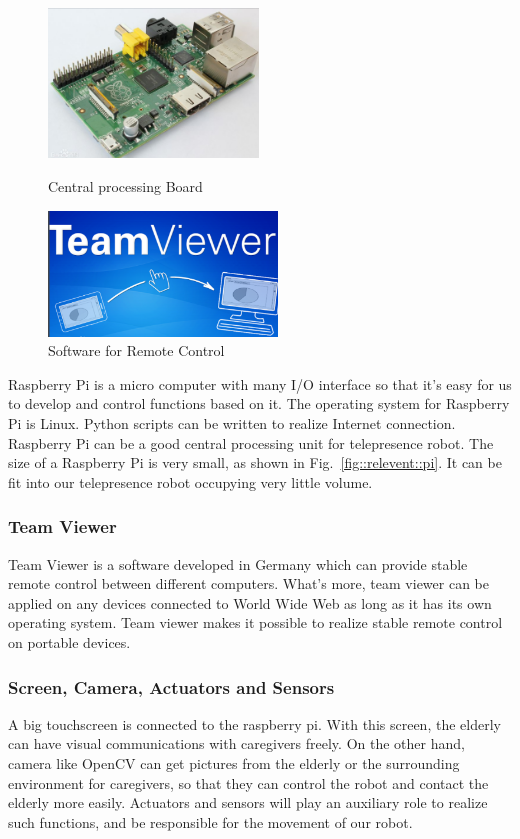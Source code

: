 \documentclass[12pt]{article}
\begin{document}
\begin{figure}[H]
	\begin{minipage}[t]{0.5\linewidth}
		\centering
		\includegraphics[width=2.2in]{P3}
		\caption{Central processing Board\cite{8}}
		\label{fig::relevent::pi}
	\end{minipage}%
	\begin{minipage}[t]{0.5\linewidth}
		\centering
		\includegraphics[width=2.4in]{P4}
		\caption{Software for Remote Control\cite{9}}
		\label{fig::relevent::teamviewer}
	\end{minipage}
\end{figure}
Raspberry Pi is a micro computer with many I/O interface so that it's easy for us to develop and control functions based on it. The operating system for Raspberry Pi is Linux. Python scripts can be written to realize Internet connection. Raspberry Pi can be a good central processing unit for telepresence robot. The size of a Raspberry Pi is very small, as shown in Fig.~\ref{fig::relevent::pi}. It can be fit into our telepresence robot occupying very little volume.
\subsubsection{Team Viewer}
Team Viewer is a software developed in Germany which can provide stable remote control between different computers. What's more, team viewer can be applied on any devices connected to World Wide Web as long as it has its own operating system. Team viewer makes it possible to realize stable remote control on portable devices.
\subsubsection{Screen, Camera, Actuators and Sensors}
A big touchscreen is connected to the raspberry pi. With this screen, the elderly can have visual communications with caregivers freely. On the other hand, camera like OpenCV can get pictures from the elderly or the surrounding environment for caregivers, so that they can control the robot and contact the elderly more easily. Actuators and sensors will play an auxiliary role to realize such functions, and be responsible for the movement of our robot.
\end{document}
